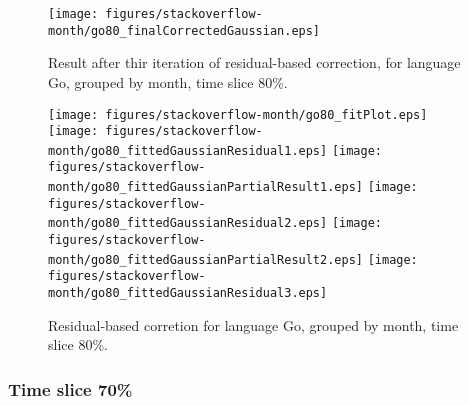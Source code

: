 \begin{figure}[]
\centering
{\texttt{[image: figures/stackoverflow-month/go80\_finalCorrectedGaussian.eps]}}
\caption{Result after thir iteration of residual-based correction, for language Go, grouped by month, time slice 80\%.}
\end{figure}


\begin{figure}[hb]
\centering
{}
{\texttt{[image: figures/stackoverflow-month/go80\_fitPlot.eps]}}
{\texttt{[image: figures/stackoverflow-month/go80\_fittedGaussianResidual1.eps]}}
{\texttt{[image: figures/stackoverflow-month/go80\_fittedGaussianPartialResult1.eps]}}
{\texttt{[image: figures/stackoverflow-month/go80\_fittedGaussianResidual2.eps]}}
{\texttt{[image: figures/stackoverflow-month/go80\_fittedGaussianPartialResult2.eps]}}
{\texttt{[image: figures/stackoverflow-month/go80\_fittedGaussianResidual3.eps]}}
\caption{Residual-based corretion for language Go, grouped by month, time slice 80\%.}
\end{figure}


\clearpage 
\newpage 


\FloatBarrier

\subsubsection{Time slice 70\%}

